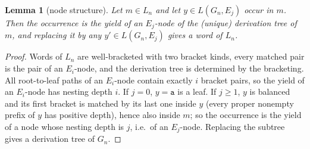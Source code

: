 \documentclass[11pt]{article}
\numberwithin{equation}{section}
\theoremstyle{plain}
\newtheorem{lemma}[theorem]{Lemma}
\theoremstyle{definition}
\theoremstyle{remark}
\theoremstyle{plain}
\newcommand{\ta}{\mathtt a}
\begin{document}
\begin{lemma}[node structure]\label{lem:nodes}
Let $m\in L_n$ and let $y\in L(G_n,E_j)$ occur in $m$.  Then the
occurrence is the yield of an $E_j$-node of the (unique) derivation tree of
$m$, and replacing it by any $y'\in L(G_n,E_j)$ gives a word of $L_n$.
\end{lemma}
\begin{proof}
Words of $L_n$ are well-bracketed with two bracket kinds, every matched
pair is the pair of an $E_i$-node, and the derivation tree is determined by
the bracketing.  All root-to-leaf paths of an $E_i$-node contain exactly $i$
bracket pairs, so the yield of an $E_i$-node has nesting depth $i$.  If
$j=0$, $y=\ta$ is a leaf.  If $j\ge1$, $y$ is balanced and its first bracket
is matched by its last one inside $y$ (every proper nonempty prefix of $y$
has positive depth), hence also inside $m$; so the occurrence is the yield of
a node whose nesting depth is $j$, i.e.\ of an $E_j$-node.  Replacing the
subtree gives a derivation tree of $G_n$.
\end{proof}
\end{document}
